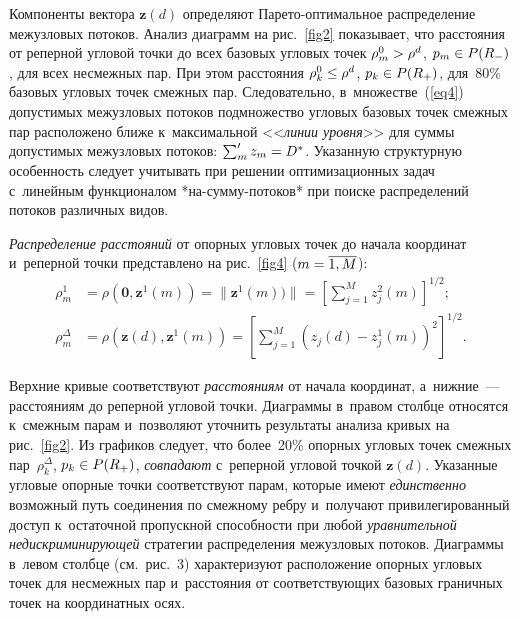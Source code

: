 \begin{multicols}{2}
Компоненты вектора $\mathbf{z}(d)$ определяют Па\-ре\-то-оп\-ти\-маль\-ное
распределение межузловых потоков. Анализ диа\-грамм на
рис.~\ref{fig2} показывает, что рас\-сто\-яния от реперной
угловой точ\-ки до всех базовых угловых точек $\rho_m^0\hm>\rho^d$,
$p_m \hm\in P(R_-)$,
 для всех несмежных пар. При этом рас\-сто\-яния $\rho_k^0\hm\le\rho^d$, $p_k \hm\in P(R_+)$,
для~80\% базовых угловых точек смеж\-ных пар. Следовательно, 
в~множестве~(\ref{eq4}) до\-пус\-ти\-мых межузловых потоков под\-мно\-же\-ст\-во угловых
базовых точек смеж\-ных пар расположено ближе к~максимальной
<<\textit{линии уровня}>> для суммы до\-пус\-ти\-мых межузловых потоков:
$\sum\nolimits_m^\prime z_m\hm=D^*$. Указанную структурную осо\-бен\-ность следует
учитывать при решении оптимизационных задач с~линейным
функционалом *на-сум\-му-по\-то\-ков* при поиске распределений потоков
различных видов.



\textit{Распределение расстояний} от опорных угловых точек до
начала координат и~реперной точ\-ки пред\-став\-ле\-но на рис.~\ref{fig4} ($m\hm=\overline{1,M}$):
\begin{align*}
\rho_m^1&=\rho(\boldsymbol{0}, \mathbf{z}^1(m))=
\|\mathbf{z}^1(m))\|=
\left[\sum\limits_{j=1}^Mz_j^2(m)\right]^{1/2};\\
\rho_m^\Delta&=\rho(\mathbf{z}(d), \mathbf{z}^1(m))=
\left[\sum\limits_{j=1}^M(z_j(d)-z_j^1(m))^2\right]^{1/2}.
\end{align*}


\noindent
Верхние кривые соответствуют \textit{расстояниям} от начала
координат, а~ниж\-ние~--- рас\-сто\-яни\-ям до реперной угловой \mbox{точки}.
%
Диаграммы в~правом столбце относятся к~смеж\-ным парам
 и~поз\-во\-ля\-ют уточ\-нить результаты анализа кривых на
рис.~\ref{fig2}. Из графиков следует, что более~20\%
опор\-ных угловых точек смеж\-ных пар~$\rho_k^\Delta$, $p_k\hm\in
P(R_+)$, \textit{совпадают} с~реперной угловой точ\-кой $\mathbf{z}(d)$. 
Указанные угловые опор\-ные точ\-ки соответствуют парам,
которые имеют \textit{единственно} воз\-мож\-ный путь со\-еди\-не\-ния по
смеж\-но\-му реб\-ру и~получают привилегированный до\-ступ к~остаточной
про\-пуск\-ной спо\-соб\-ности при любой \textit{уравнительной
недискриминирующей} стратегии распределения меж\-уз\-ло\-вых потоков.
Диаграммы в~левом столбце (см.\ рис.~3) характеризуют
расположение опорных угловых точек для несмежных пар и~рас\-сто\-яния
от со\-от\-вет\-ст\-ву\-ющих базовых граничных точек на координатных осях.




\end{multicols}
